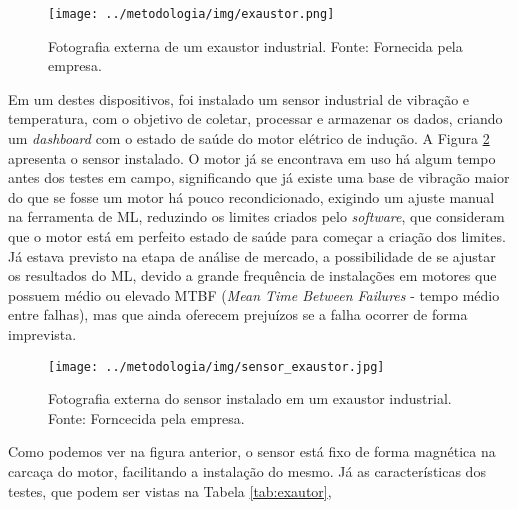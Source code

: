 \documentclass[a4paper]{ifacconf}
\begin{document}
\begin{figure}[h!]
  \begin{center}
      \texttt{[image: ../metodologia/img/exaustor.png]}
  \end{center}
  \caption{Fotografia externa de um exaustor industrial. Fonte: Fornecida pela empresa.}
  \label{fig:exautor}
\end{figure}

Em um destes dispositivos, foi instalado um sensor industrial de vibração e temperatura, com o objetivo de coletar, processar e armazenar os
dados, criando um \textit{dashboard} com o estado de saúde do motor elétrico de indução. A Figura \ref{fig:sensor_exaustor} apresenta o sensor instalado.
O motor já se encontrava em uso há algum tempo antes dos testes em campo, significando que já existe uma base de vibração maior do que se fosse
um motor há pouco recondicionado, exigindo um ajuste manual na ferramenta de ML, reduzindo os limites criados pelo \textit{software}, que
consideram que o motor está em perfeito estado de saúde para começar a criação dos limites. Já estava previsto na etapa de análise de mercado, 
a possibilidade de se ajustar os resultados do ML, devido a grande frequência de instalações em motores que possuem médio ou
elevado MTBF (\textit{Mean Time Between Failures} - tempo médio entre falhas), mas que ainda oferecem prejuízos se a falha ocorrer de forma 
imprevista.

\begin{figure}[h!]
  \begin{center}
      \texttt{[image: ../metodologia/img/sensor\_exaustor.jpg]}
  \end{center}
  \caption{Fotografia externa do sensor instalado em um exaustor industrial. Fonte: Forncecida pela empresa.}
  \label{fig:sensor_exaustor}
\end{figure}

Como podemos ver na figura anterior, o sensor está fixo de forma magnética na carcaça do motor, facilitando a instalação do mesmo. Já as 
características dos testes, que podem ser vistas na Tabela \ref{tab:exautor}, 
\end{document}
